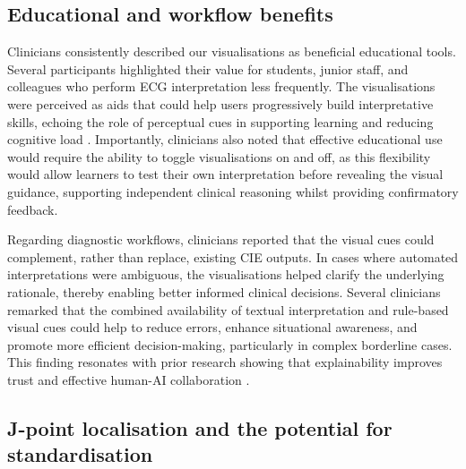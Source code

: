 \documentclass[
  10pt,
  letterpaper,
]{article}
\begin{document}
\subsection{Educational and workflow
benefits}\label{educational-and-workflow-benefits}

Clinicians consistently described our visualisations as beneficial
educational tools. Several participants highlighted their value for
students, junior staff, and colleagues who perform ECG interpretation
less frequently. The visualisations were perceived as aids that could
help users progressively build interpretative skills, echoing the role
of perceptual cues in supporting learning and reducing cognitive load
\cite{paas_2020, northdruft_1993}. Importantly, clinicians also noted
that effective educational use would require the ability to toggle
visualisations on and off, as this flexibility would allow learners to
test their own interpretation before revealing the visual guidance,
supporting independent clinical reasoning whilst providing confirmatory
feedback.

Regarding diagnostic workflows, clinicians reported that the visual cues
could complement, rather than replace, existing CIE outputs. In cases
where automated interpretations were ambiguous, the visualisations
helped clarify the underlying rationale, thereby enabling better
informed clinical decisions. Several clinicians remarked that the
combined availability of textual interpretation and rule-based visual
cues could help to reduce errors, enhance situational awareness, and
promote more efficient decision-making, particularly in complex
borderline cases. This finding resonates with prior research showing
that explainability improves trust and effective human-AI collaboration
\cite{elul_meeting_2021, burgess_healthcare_2023, asan_artificial_2020}.

\subsection{J-point localisation and the potential for
standardisation}\label{j-point-localisation-and-the-potential-for-standardisation}
\end{document}
